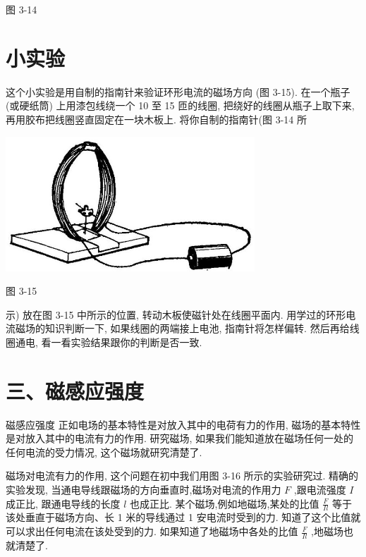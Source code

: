 \documentclass[10pt]{article}
\begin{document}
图 3-14

\section*{小实验}

这个小实验是用自制的指南针来验证环形电流的磁场方向 (图 3-15). 在一个瓶子 (或硬纸筒) 上用漆包线绕一个 10 至 15 匝的线圈, 把绕好的线圈从瓶子上取下来, 再用胶布把线圈竖直固定在一块木板上. 将你自制的指南针(图 3-14 所

\begin{center}
\includegraphics[max width=0.7\textwidth]{images/01913056-1f15-74d8-9184-9aab52c9d66b_110_691889.jpg}
\end{center}

图 3-15

示) 放在图 3-15 中所示的位置, 转动木板使磁针处在线圈平面内. 用学过的环形电流磁场的知识判断一下, 如果线圈的两端接上电池, 指南针将怎样偏转. 然后再给线圈通电, 看一看实验结果跟你的判断是否一致.

\section*{三、磁感应强度}

磁感应强度 正如电场的基本特性是对放入其中的电荷有力的作用, 磁场的基本特性是对放入其中的电流有力的作用. 研究磁场, 如果我们能知道放在磁场任何一处的任何电流的受力情况, 这个磁场就研究清楚了.

磁场对电流有力的作用, 这个问题在初中我们用图 3-16 所示的实验研究过. 精确的实验发现, 当通电导线跟磁场的方向垂直时,磁场对电流的作用力 \(F\) ,跟电流强度 \(I\) 成正比, 跟通电导线的长度 \(l\) 也成正比. 某个磁场,例如地磁场,某处的比值 \(\frac{F}{Il}\) 等于该处垂直于磁场方向、长 1 米的导线通过 1 安电流时受到的力. 知道了这个比值就可以求出任何电流在该处受到的力. 如果知道了地磁场中各处的比值 \(\frac{F}{Il}\) ,地磁场也就清楚了.
\end{document}
